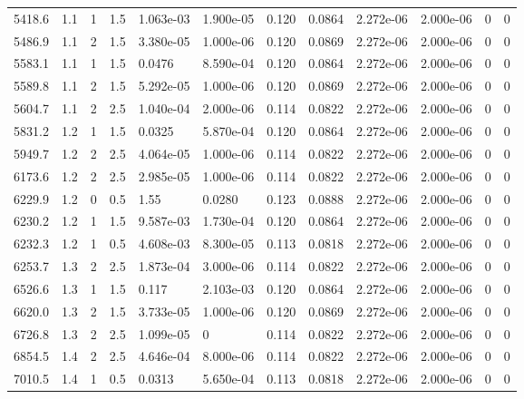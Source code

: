 \documentclass[preview]{standalone}
\begin{document}
{{{\begin{tabular}{L{1.2cm}C{1.2cm} C{0.3cm}C{0.5cm} C{1.4cm}C{1.4cm} C{1.4cm}C{1.4cm} C{1.6cm}C{1.6cm} C{1.6cm}C{1.6cm}}
  5418.6  &   1.1  & 1     & 1.5 &  1.063e-03  & 1.900e-05  &  0.120&   0.0864& 2.272e-06 & 2.000e-06   &  0 & 0  \\ 
  5486.9  &   1.1  & 2     & 1.5 &  3.380e-05  & 1.000e-06  &  0.120&   0.0869& 2.272e-06 & 2.000e-06   &  0 & 0  \\ 
  5583.1  &   1.1  & 1     & 1.5 &  0.0476  & 8.590e-04  &  0.120&   0.0864& 2.272e-06 & 2.000e-06   &  0 & 0  \\ 
  5589.8  &   1.1  & 2     & 1.5 &  5.292e-05  & 1.000e-06  &  0.120&   0.0869& 2.272e-06 & 2.000e-06   &  0 & 0  \\ 
  5604.7  &   1.1  & 2     & 2.5 &  1.040e-04  & 2.000e-06  &  0.114&   0.0822& 2.272e-06 & 2.000e-06   &  0 & 0  \\ 
  5831.2  &   1.2  & 1     & 1.5 &  0.0325  & 5.870e-04  &  0.120&   0.0864& 2.272e-06 & 2.000e-06   &  0 & 0  \\ 
  5949.7  &   1.2  & 2     & 2.5 &  4.064e-05  & 1.000e-06  &  0.114&   0.0822& 2.272e-06 & 2.000e-06   &  0 & 0  \\ 
  6173.6  &   1.2  & 2     & 2.5 &  2.985e-05  & 1.000e-06  &  0.114&   0.0822& 2.272e-06 & 2.000e-06   &  0 & 0  \\ 
  6229.9  &   1.2  & 0     & 0.5 &  1.55  & 0.0280  &  0.123&   0.0888& 2.272e-06 & 2.000e-06   &  0 & 0  \\ 
  6230.2  &   1.2  & 1     & 1.5 &  9.587e-03  & 1.730e-04  &  0.120&   0.0864& 2.272e-06 & 2.000e-06   &  0 & 0  \\ 
  6232.3  &   1.2  & 1     & 0.5 &  4.608e-03  & 8.300e-05  &  0.113&   0.0818& 2.272e-06 & 2.000e-06   &  0 & 0  \\ 
  6253.7  &   1.3  & 2     & 2.5 &  1.873e-04  & 3.000e-06  &  0.114&   0.0822& 2.272e-06 & 2.000e-06   &  0 & 0  \\ 
  6526.6  &   1.3  & 1     & 1.5 &  0.117  & 2.103e-03  &  0.120&   0.0864& 2.272e-06 & 2.000e-06   &  0 & 0  \\ 
  6620.0  &   1.3  & 2     & 1.5 &  3.733e-05  & 1.000e-06  &  0.120&   0.0869& 2.272e-06 & 2.000e-06   &  0 & 0  \\ 
  6726.8  &   1.3  & 2     & 2.5 &  1.099e-05  & 0  &  0.114&   0.0822& 2.272e-06 & 2.000e-06   &  0 & 0  \\ 
  6854.5  &   1.4  & 2     & 2.5 &  4.646e-04  & 8.000e-06  &  0.114&   0.0822& 2.272e-06 & 2.000e-06   &  0 & 0  \\ 
  7010.5  &   1.4  & 1     & 0.5 &  0.0313  & 5.650e-04  &  0.113&   0.0818& 2.272e-06 & 2.000e-06   &  0 & 0  \\ 

\end{tabular}}}}
\end{document}
